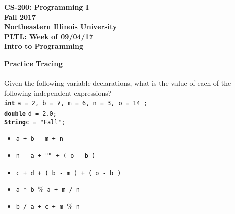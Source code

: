 \documentclass[12pt]{article}
\begin{document}
\begin{center}
	\textbf{CS-200: Programming I}\\
	\textbf{Fall 2017}\\
	\textbf{Northeastern Illinois University}\\
	\textbf{PLTL: Week of 09/04/17}\\
	\textbf{Intro to Programming}\\
\end{center}

\noindent\textbf{Practice Tracing}\\ \\
Given the following variable declarations, what is the value of each of the following independent expressions?\\
\hspace*{0.5cm}\textbf{\texttt{int}} \texttt{a = 2, b = 7, m = 6, n = 3, o = 14 ;}\\
\hspace*{0.5cm}\textbf{\texttt{double}} \texttt{d = 2.0;}\\
\hspace*{0.5cm}\textbf{\texttt{String}}\texttt{c = "Fall";}\\
\begin{itemize}

	\item \texttt{a + b - m + n}
	\item \texttt{n - a + "" + ( o - b )}
	\item \texttt{c + d + ( b - m ) + ( o - b )}
	\item \texttt{a * b $\%$ a + m / n}
	\item \texttt{b / a + c + m  $\%$ n}
	
\end{itemize}
\end{document}
